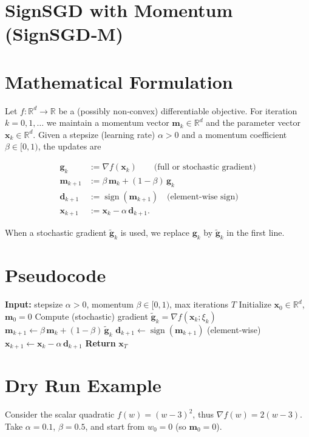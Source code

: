 \documentclass{article}
\newcommand{\sign}{\operatorname{sign}}
\newcommand{\R}{\mathbb{R}}
\begin{document}
\section*{SignSGD with Momentum (SignSGD‑M)}

\section*{Mathematical Formulation}
Let $f:\R^{d}\rightarrow\R$ be a (possibly non‑convex) differentiable objective.  
For iteration $k=0,1,\dots$ we maintain a momentum vector $\bm{m}_{k}\in\R^{d}$ and the parameter vector $\bm{x}_{k}\in\R^{d}$.  
Given a stepsize (learning rate) $\alpha>0$ and a momentum coefficient $\beta\in[0,1)$, the updates are

\[
\begin{aligned}
\bm{g}_{k} &:= \nabla f(\bm{x}_{k}) \qquad\text{(full or stochastic gradient)}\\[4pt]
\bm{m}_{k+1} &:= \beta\,\bm{m}_{k} + (1-\beta)\,\bm{g}_{k} \\[4pt]
\bm{d}_{k+1} &:= \sign(\bm{m}_{k+1}) \quad\text{(element‑wise sign)}\\[4pt]
\bm{x}_{k+1} &:= \bm{x}_{k} - \alpha\,\bm{d}_{k+1}.
\end{aligned}
\tag{1}
\]

When a stochastic gradient $\tilde{\bm{g}}_{k}$ is used, we replace $\bm{g}_{k}$ by $\tilde{\bm{g}}_{k}$ in the first line.

\section*{Pseudocode}
\begin{algorithm}[H]
\caption{SignSGD with Momentum}
\begin{algorithmic}[1]
\STATE \textbf{Input:} stepsize $\alpha>0$, momentum $\beta\in[0,1)$, max iterations $T$
\STATE Initialize $\bm{x}_{0}\in\R^{d}$, $\bm{m}_{0}=0$
    \STATE Compute (stochastic) gradient $\tilde{\bm{g}}_{k}=\nabla f(\bm{x}_{k};\xi_{k})$
    \STATE $\bm{m}_{k+1}\gets \beta\,\bm{m}_{k}+(1-\beta)\,\tilde{\bm{g}}_{k}$
    \STATE $\bm{d}_{k+1}\gets \sign(\bm{m}_{k+1})$  \hfill (element‑wise)
    \STATE $\bm{x}_{k+1}\gets \bm{x}_{k}-\alpha\,\bm{d}_{k+1}$
\ENDFOR
\STATE \textbf{Return} $\bm{x}_{T}$
\end{algorithmic}
\end{algorithm}

\section*{Dry Run Example}
Consider the scalar quadratic $f(w)=(w-3)^{2}$, thus $\nabla f(w)=2(w-3)$.  
Take $\alpha=0.1$, $\beta=0.5$, and start from $w_{0}=0$ (so $\bm{m}_{0}=0$).
\end{document}
